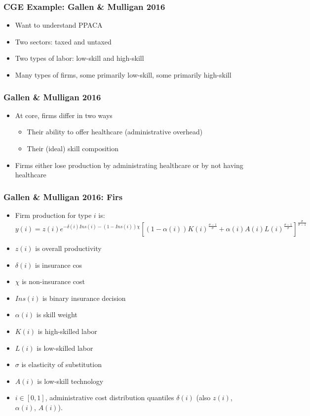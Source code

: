 \documentclass{beamer}
\begin{document}
\begin{frame}
\frametitle[alignment=center]{CGE Example: Gallen \& Mulligan 2016}
\begin{itemize}
\item Want to understand PPACA
\bigskip
\item Two sectors: taxed and untaxed
\bigskip
\item Two types of labor: low-skill and high-skill
\bigskip
\item Many types of firms, some primarily low-skill, some primarily high-skill
\end{itemize}
\end{frame}

\begin{frame}
\frametitle[alignment=center]{Gallen \& Mulligan 2016}
\begin{itemize}
\item At core, firms differ in two ways
\bigskip
\begin{itemize}
\item Their ability to offer healthcare (administrative overhead)
\bigskip
\smallskip
\item Their (ideal) skill composition
\bigskip
\end{itemize}
\item Firms either lose production by administrating healthcare or by not having healthcare
\end{itemize}
\end{frame}

\begin{frame}
\frametitle[alignment=center]{Gallen \& Mulligan 2016: Firs}
\begin{itemize}
\item Firm production for type $i$ is:
\small
$$y(i)=z(i)e^{-\delta(i)Ins(i)-(1-Ins(i))\chi}\left[(1-\alpha(i))K(i)^\frac{\sigma-1}{\sigma}+\alpha(i)A(i)L(i)^\frac{\sigma-1}{\sigma}\right]^\frac{\sigma}{\sigma-1}$$
\item $z(i)$ is overall productivity
\item $\delta(i)$ is insurance cos
\item $\chi$ is non-insurance cost
\item $Ins(i)$ is binary insurance decision
\item $\alpha(i)$ is skill weight
\item $K(i)$ is high-skilled labor
\item $L(i)$ is low-skilled labor
\item $\sigma$ is elasticity of substitution
\item $A(i)$ is low-skill technology
\item $i\in\left[0,1\right]$, administrative cost distribution quantiles $\delta(i)$ (also $z(i)$, $\alpha(i)$, $A(i)$).
\end{itemize}
\end{frame}
\end{document}
